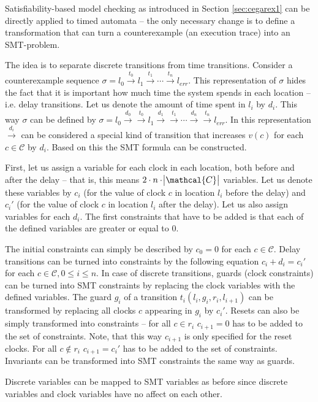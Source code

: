 Satisfiability-based model checking as introduced in Section \ref{sec:cegarex1} can be directly applied to timed automata -- the only necessary change is to define a transformation that can turn a counterexample (an execution trace) into an SMT-problem.

The idea is to separate discrete transitions from time transitions. Consider a counterexample sequence $\sigma = l_0 \xrightarrow{t_0} l_1 \xrightarrow{t_1} \cdots \xrightarrow{t_n} l_{err}$.  This representation of $\sigma$ hides the fact that it is important how much time the system spends in each location -- i.e. delay transitions. Let us denote the amount of time spent in $l_i$ by $d_i$. This way $\sigma$ can be defined by $\sigma = l_0 \xrightarrow{d_0} \xrightarrow{t_0} l_1 \xrightarrow{d_1} \xrightarrow{t_1} \cdots \xrightarrow{d_n} \xrightarrow{t_n} l_{err}$. In this representation $\xrightarrow{d_i}$ can be considered a special kind of transition that increases $v(c)$ for each $c \in \mathcal{C}$ by $d_i$. Based on this the SMT formula can be constructed.

First, let us assign a variable for each clock in each location, both before and after the delay -- that is, this means $2\cdot n \cdot \abs{\mathcal{C}}$ variables. Let us denote these variables by $c_i$ (for the value of clock $c$ in location $l_i$ before the delay) and $c_i'$ (for the value of clock $c$ in location $l_i$ after the delay). Let us also assign variables for each $d_i$. The first constraints that have to be added is that each of the defined variables are greater or equal to 0.

The initial constraints can simply be described by $c_0 =0$ for each $c \in \mathcal{C}$. Delay transitions can be turned into constraints by the following equation $c_i+d_i=c_i'$ for each $c \in \mathcal{C}, 0 \leq i \leq n$. In case of discrete transitions, guards (clock constraints) can be turned into SMT constraints by replacing the clock variables with the defined variables. The guard $g_i$ of a transition $t_i(l_i,g_i,r_i,l_{i+1})$ can be transformed by replacing all clocks $c$ appearing in $g_i$ by $c_i'$. Resets can also be simply transformed into constraints -- for all $c \in r_i$ $c_{i+1}=0$ has to be added to the set of constraints. Note, that this way $c_{i+1}$ is only specified for the reset clocks. For all $c \not\in r_i$ $c_{i+1}=c_i'$ has to be added to the set of constraints. Invariants can be transformed into SMT constraints the same way as guards.

Discrete variables can be mapped to SMT variables as before since discrete variables and clock variables have no affect on each other.


